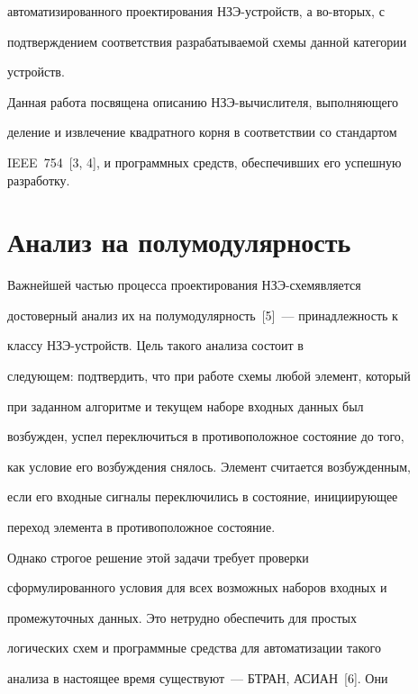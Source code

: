 автоматизированного проектирования НЗЭ-устройств, а во-вторых, с


подтверждением соответствия разрабатываемой схемы данной категории


устройств.





   Данная работа посвящена описанию НЗЭ-вычислителя, выполняющего


деление и извлечение квадратного корня в соответствии со стандартом


IEEE~754~[3, 4], и программных средств, обеспечивших его успешную разработку.





   \section{Анализ на полумодулярность}





   Важнейшей частью процесса проектирования НЗЭ-схем\linebreak является


достоверный анализ их на полумодулярность~[5]~--- принадлежность к


классу НЗЭ-устройств. Цель такого анализа состоит в


следующем: подтвердить, что при работе схемы любой элемент, который


при заданном алгоритме и текущем наборе входных данных был


возбужден, успел переключиться в противоположное состояние до того,


как условие его возбуждения снялось. Элемент считается возбужденным,


если его входные сигналы переключились в состояние, инициирующее


переход элемента в противоположное состояние.





   Однако строгое решение этой задачи требует проверки


сформулированного условия для всех возможных наборов входных и


промежуточных данных. Это нетрудно обеспечить для простых


логических схем и программные средства для автоматизации такого


анализа в настоящее время существуют~--- БТРАН, АСИАН~[6]. Они


